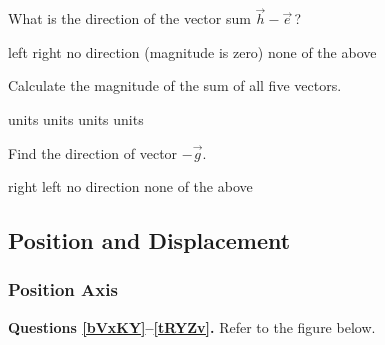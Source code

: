 \documentclass[]{exam}
\begin{document}
\begin{questions}
\question
What is the direction of the vector sum $\vec{h} - \vec{e}\,$?

\begin{randomizechoices}[keeplast]
    \correctchoice left
    \choice right
    \choice no direction (magnitude is zero)
    \choice none of the above
\end{randomizechoices}

\question
Calculate the magnitude of the sum of all five vectors.

\begin{randomizechoices}
     units
     units 
     units
     units
\end{randomizechoices}

\question \label{oFwyb}
Find the direction of vector $-\vec{g}$.

\begin{randomizechoices}[keeplast]
    \correctchoice right
    \choice left
    \choice no direction
    \choice none of the above
\end{randomizechoices}


\end{questions}

\clearpage
\subsection{Position and Displacement}

\subsubsection{Position Axis}

\textbf{Questions \ref{bVxKY}--\ref{tRYZv}.} Refer to the figure below.

\begin{center}
\end{center}
\end{document}
